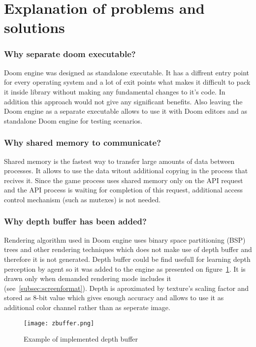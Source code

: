 \section{Explanation of problems and solutions}\label{sec:architecture_solutions}

\subsubsection{Why separate doom executable?}

Doom engine was designed as standalone executable. It has a diffrent entry point for every operating system and a lot of exit points what makes it difficult to pack it inside library without making any fundamental changes to it's code. In addition this approach would not give any significant benefits. Also leaving the Doom engine as a separate executable allows to use it with Doom editors and as standalone Doom engine for testing scenarios.

\subsubsection{Why shared memory to communicate?}

Shared memory is the fastest way to transfer large amounts of data between processes. It allows to use the data witout additional copying in the process that recives it. 
Since the game process uses shared memory only on the API request and the API process is waiting for completion of this request, additional access control mechanism (such as mutexes) is not needed.

\subsubsection{Why depth buffer has been added?}

Rendering algorithm used in Doom engine uses binary space partitioning (BSP) trees and other rendering techniques which does not make use of depth buffer and therefore it is not generated.
Depth buffer could be find usefull for learning depth perception by agent so it was added to the engine as presented on figure~\ref{fig:zbuffer}.
It is drawn only when demanded rendering mode includes it (see~\ref{subsec:screenformat}).
Depth is aproximated by texture's scaling factor and stored as 8-bit value which gives enough accuracy and allows to use it as additional color channel rather than as seperate image.

\begin{figure}
\centering
\texttt{[image: zbuffer.png]}
\caption{Example of implemented depth buffer}
\label{fig:zbuffer}
\end{figure}


